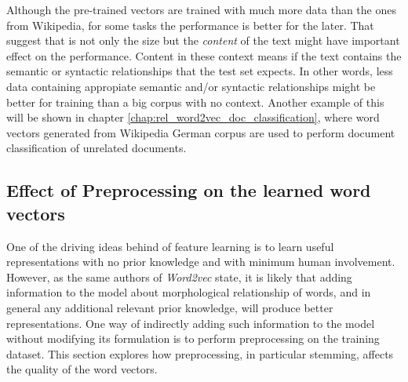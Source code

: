 Although the pre-trained vectors are trained with much more data
than the ones from Wikipedia, for some tasks the performance is better for the
later. That suggest that is not only the size but the \emph{content} of the
text might have important effect on the performance. Content  in these context
means if the text contains the semantic or syntactic relationships  that the
test set expects. In other words, less data containing appropiate  semantic and/or
syntactic relationships might be better for training than a big corpus with
no context. Another example of this will be shown in chapter
\ref{chap:rel_word2vec_doc_classification}, where  word vectors generated
from Wikipedia German corpus are used to perform document classification of
unrelated documents.





\subsection{Effect of Preprocessing on the learned word vectors}
\label{sec:sub:effects_of_preprocessing_on_learned_word_vectors}

One of the driving ideas behind of feature learning is to learn useful
representations with no prior knowledge and with minimum human
involvement. However, as the same authors of \textit{Word2vec} state, it is likely
that adding information to the model about morphological relationship of
words, and in general any additional relevant prior knowledge,  will produce better
representations.  One way of indirectly adding such information to the model
without modifying its formulation is to perform preprocessing on the training
dataset. This section explores how preprocessing, in particular stemming,  affects the
quality of the word vectors. 
 

